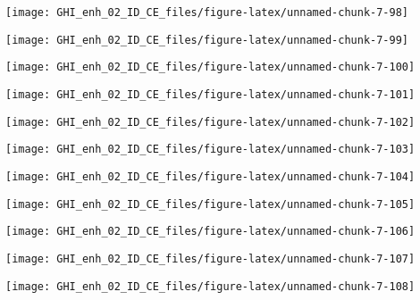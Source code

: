 \documentclass[
  10pt,
  a4paper,oneside]{article}
\begin{document}
\begin{center}\texttt{[image: GHI\_enh\_02\_ID\_CE\_files/figure-latex/unnamed-chunk-7-98]} \end{center}

\begin{center}\texttt{[image: GHI\_enh\_02\_ID\_CE\_files/figure-latex/unnamed-chunk-7-99]} \end{center}

\begin{center}\texttt{[image: GHI\_enh\_02\_ID\_CE\_files/figure-latex/unnamed-chunk-7-100]} \end{center}

\begin{center}\texttt{[image: GHI\_enh\_02\_ID\_CE\_files/figure-latex/unnamed-chunk-7-101]} \end{center}

\begin{center}\texttt{[image: GHI\_enh\_02\_ID\_CE\_files/figure-latex/unnamed-chunk-7-102]} \end{center}

\begin{center}\texttt{[image: GHI\_enh\_02\_ID\_CE\_files/figure-latex/unnamed-chunk-7-103]} \end{center}

\begin{center}\texttt{[image: GHI\_enh\_02\_ID\_CE\_files/figure-latex/unnamed-chunk-7-104]} \end{center}

\begin{center}\texttt{[image: GHI\_enh\_02\_ID\_CE\_files/figure-latex/unnamed-chunk-7-105]} \end{center}

\begin{center}\texttt{[image: GHI\_enh\_02\_ID\_CE\_files/figure-latex/unnamed-chunk-7-106]} \end{center}

\begin{center}\texttt{[image: GHI\_enh\_02\_ID\_CE\_files/figure-latex/unnamed-chunk-7-107]} \end{center}

\begin{center}\texttt{[image: GHI\_enh\_02\_ID\_CE\_files/figure-latex/unnamed-chunk-7-108]} \end{center}
\end{document}
